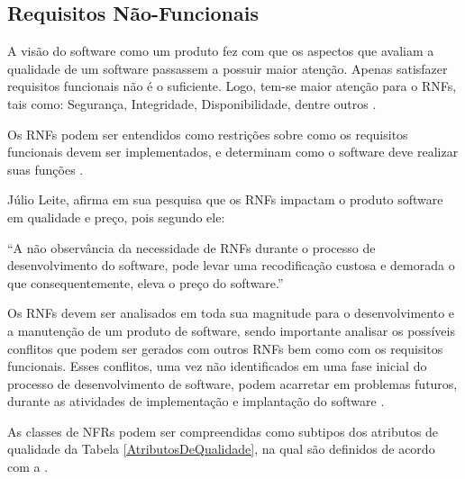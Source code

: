 \subsection{Requisitos Não-Funcionais}
\label{subsec:requisitosNaoFuncionais}

A visão do software como um produto fez com que os aspectos que avaliam a qualidade de um software passassem a possuir maior atenção. Apenas satisfazer requisitos funcionais não é o suficiente. Logo, tem-se maior atenção para o RNFs, tais como: Segurança, Integridade, Disponibilidade, dentre outros \cite{cysneiros1997definindo}.

Os RNFs podem ser entendidos como restrições sobre como os requisitos funcionais devem ser implementados, e determinam como o software deve realizar suas funções \cite{sommerville1997requirements}.


Júlio Leite, afirma em sua pesquisa que os RNFs impactam o produto software em qualidade e preço, pois segundo ele:

\begin{citacao}
	“A não observância da necessidade de RNFs durante o processo de desenvolvimento do software, pode levar uma recodificação custosa e demorada o que consequentemente, eleva o preço do software.” \cite[p. 2]{cysneiros1997definindo}
\end{citacao}


Os RNFs devem ser analisados em toda sua magnitude para o desenvolvimento e a manutenção de um produto de software, sendo importante analisar os possíveis conflitos que podem ser gerados com outros RNFs bem como com os requisitos funcionais. Esses conflitos, uma vez não identificados em uma fase inicial do processo de desenvolvimento de software, podem acarretar em problemas futuros, durante as atividades de implementação e implantação do software \cite{cysneiros1997definindo}. 


As classes de NFRs \cite{eckhardt2016non} podem ser compreendidas como subtipos dos atributos de qualidade da Tabela \ref{AtributosDeQualidade}, na qual são definidos de acordo com a \cite{organizacion2011iso}. 

